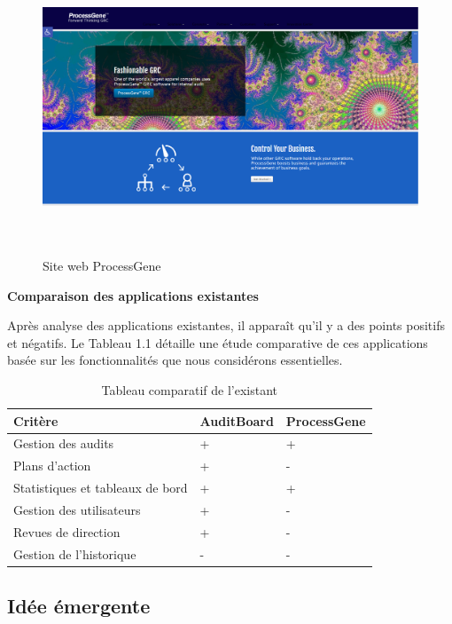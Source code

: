 \begin{figure}[H]%
    \center%
{
    \includegraphics[width=13cm,height=8cm]{images/processgene.PNG}%
    }
    \caption{Site web ProcessGene}%
\end{figure}

\noindent\large\textbf{Comparaison des applications existantes}\normalsize
\vspace{0.3em}

\noindent Après analyse des applications existantes, il apparaît qu'il y a des points positifs et négatifs. Le Tableau 1.1 détaille une étude comparative de ces applications basée sur les fonctionnalités que nous considérons essentielles.

\begin{table}[h]
\small
\centering
\setlength{\tabcolsep}{4pt}
\caption{Tableau comparatif de l'existant}
\label{table:comparaison-verticale}
\begin{tabularx}{\textwidth}{|l|>{\centering\arraybackslash}X|>{\centering\arraybackslash}X|}
\hline
\textbf{Critère} & \textbf{AuditBoard} & \textbf{ProcessGene} \\ \hline
Gestion des audits & + & + \\ \hline
Plans d'action & + & - \\ \hline
Statistiques et tableaux de bord & + & + \\ \hline
Gestion des utilisateurs & + & - \\ \hline
Revues de direction & + & - \\ \hline
Gestion de l'historique & - & - \\ \hline
\end{tabularx}
\end{table}

\subsection{Idée émergente}

